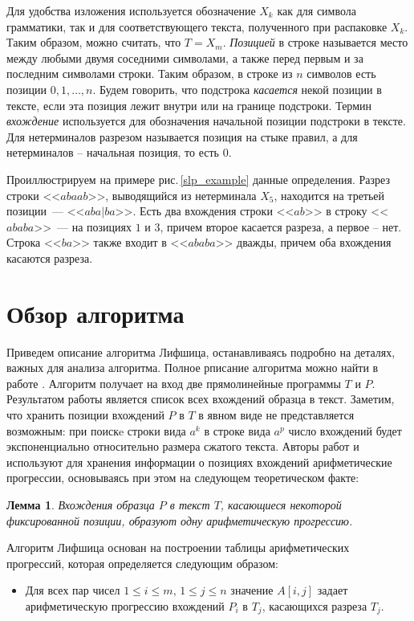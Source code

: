 \documentclass[14pt]{article}
\newtheorem{lemma}{Лемма}[section]
\begin{document}
Для удобства изложения используется обозначение $X_k$ как для символа грамматики, так и для соответствующего текста, полученного при распаковке $X_k$. Таким образом, можно считать, что $T = X_m$.
\emph{Позицией} в строке называется место между любыми двумя соседними символами, а также перед первым и за последним символами строки. Таким образом, в строке из $n$ символов есть позиции $0,1,\dots,n$. Будем говорить, что подстрока \emph{касается} некой позиции в тексте, если эта позиция лежит внутри или на границе подстроки. Термин \emph{вхождение} используется для обозначения начальной позиции подстроки в тексте. Для нетерминалов разрезом называется позиция на стыке правил, а для нетерминалов -- начальная позиция, то есть 0.

Проиллюстрируем на примере рис.\,\ref{slp_example} данные определения. Разрез строки <<$abaab$>>, выводящийся из нетерминала $X_5$, находится на третьей позиции~--- <<$aba|ba$>>. Есть два вхождения строки <<$ab$>> в строку <<$ababa$>>~--- на позициях $1$ и $3$, причем второе касается разреза, а первое -- нет. Строка <<$ba$>> также входит в <<$ababa$>> дважды, причем оба вхождения касаются разреза.

\newpage
\section{Обзор алгоритма}
Приведем описание алгоритма Лифшица, останавливаясь подробно на деталях, важных для анализа алгоритма. Полное рписание алгоритма можно найти в работе \cite{Lifshits}. Алгоритм получает на вход две прямолинейные программы $T$ и $P$. Результатом работы является список всех вхождений образца в текст. Заметим, что хранить позиции вхождений $P$ в $T$ в явном виде не представляется возможным: при поискe строки вида $a^k$ в строке вида $a^p$ число вхождений будет экспоненциально относительно размера сжатого текста. Авторы работ \cite{Lifshits} и \cite{1997} используют для хранения информации о позициях вхождений арифметические прогрессии, основываясь при этом на следующем теоретическом факте:

\begin{lemma} \label{main}
Вхождения образца $P$ в текст $T$, касающиеся некоторой фиксированной позиции, образуют одну арифметическую прогрессию.
\end{lemma}

Алгоритм Лифшица основан на построении таблицы арифметических прогрессий, которая определяется следующим образом:

\begin{itemize}
\item Для всех  пар чисел $1 \leqslant i \leqslant m,\, 1 \leqslant j \leqslant n$ значение $A[i,j]$ задает арифметическую прогрессию вхождений 
$P_i$ в $T_j$, касающихся разреза $T_j$.
\end{itemize}
\end{document}
